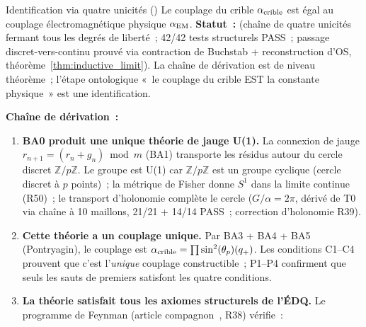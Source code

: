 \documentclass[12pt,a4paper]{article}
\begin{document}
\begin{thmbox}{Identification via quatre unicités (\BRIDGETAG)}
\label{thm:reconstruction}
Le couplage du crible $\alpha_{\rm crible}$ est égal au couplage
électromagnétique physique $\alpha_{\mathrm{EM}}$.
\textbf{Statut~:} \BRIDGETAG{} (chaîne de quatre unicités fermant
tous les degrés de liberté~; 42/42 tests structurels PASS~; passage
discret-vers-continu prouvé via contraction de Buchstab +
reconstruction d'OS, théorème~\ref{thm:inductive_limit}). La chaîne
de dérivation est de niveau théorème~; l'étape ontologique «~le
couplage du crible EST la constante physique~» est une
identification.

\medskip\noindent\textbf{Chaîne de dérivation~:}
\begin{enumerate}[leftmargin=*, label=\textbf{(\roman*)}]
\item \textbf{BA0 produit une unique théorie de jauge U(1).}
  La connexion de jauge $r_{n+1} = (r_n + g_n) \bmod m$ (BA1)
  transporte les résidus autour du cercle discret
  $\mathbb{Z}/p\mathbb{Z}$. Le groupe est U(1) car
  $\mathbb{Z}/p\mathbb{Z}$ est un groupe cyclique (cercle discret
  à $p$ points)~; la métrique de Fisher donne $S^1$ dans la limite
  continue (R50)~; le transport d'holonomie complète le cercle
  ($G/\alpha = 2\pi$, dérivé de T0 via chaîne à 10 maillons, 21/21
  + 14/14 PASS~; correction d'holonomie R39).

\item \textbf{Cette théorie a un couplage unique.}
  Par BA3 + BA4 + BA5 (Pontryagin), le couplage est
  $\alpha_{\rm crible} = \prod \sin^2(\theta_{p})(q_{+})$. Les conditions
  C1--C4 prouvent que c'est l'\emph{unique} couplage constructible~;
  P1--P4 confirment que seuls les sauts de premiers satisfont les
  quatre conditions.

\item \textbf{La théorie satisfait tous les axiomes structurels de l'ÉDQ.}
  Le programme de Feynman (article
  compagnon~\cite{companion_physics}, R38) vérifie~:


\end{enumerate}
\end{thmbox}
\end{document}
